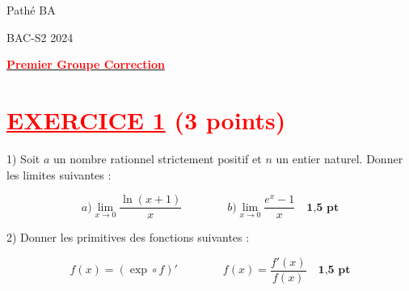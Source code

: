 \documentclass[12pt]{article}
\begin{document}
\begin{minipage}{0.8\textwidth}
	Pathé BA                          
\end{minipage}
\begin{minipage}{0.8\textwidth}
	BAC-S2 2024
\end{minipage}

\begin{center}
\textbf{{\underline{\textcolor{red}{Premier Groupe Correction}}}}
\end{center}





\section*{\textcolor{red}{\underline{EXERCICE 1} (3 points) }}
1) Soit \(a\) un nombre rationnel strictement positif et \(n\) un entier naturel. Donner les limites suivantes :

\[
a) \lim_{x \to 0} \frac{\ln(x+1)}{x}\quad\quad\quad\quad b) \lim_{x \to 0} \frac{e^x - 1}{x}\quad \textbf{1,5 pt} \]


2) Donner les primitives des fonctions suivantes :

\[
 f(x) = ( \exp \circ f)' \quad\quad\quad\quad f(x) = \frac{f'(x)}{f(x)}  \quad \textbf{1,5 pt}
\]
\end{document}
